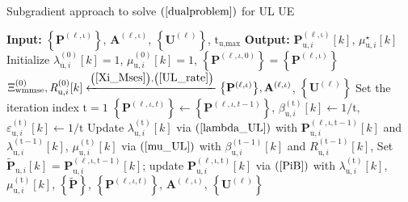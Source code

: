\documentclass[10pt,journal]{IEEEtran}
\newcommand{\paren}[1]{\left({#1}\right)}
\newcommand{\bracket}[1]{{\left [{#1}\right ]}}
\newcommand{\braces}[1]{{\left\{ {#1}\right\}}}
\newcommand{\sfrac}[2]{#1/#2}
\theoremstyle{definition}
\begin{document}
\begin{algorithm}[ht!]
\caption{Subgradient approach to solve $\paren{\ref{dualproblem}}$ for UL UE}
\label{ULalgorithm}
\begin{algorithmic}[1]
\Statex \textbf{Input: } $\braces{\mathbf{P}^{\paren{\mathrm{\ell,\iota}}}}$,  $\mathbf{A}^{\paren{\mathrm{\ell,\iota}}}$, $\braces{\mathbf{U}^{\paren{\mathrm{\ell}}}}$, $\mathrm{t}_{\textrm{u,max}}$
\Statex \textbf{Output:} $\mathbf{P}^{\paren{\mathrm{\ell,\iota}}}_{\textrm{u},i}\bracket{k}$, $\mu^\star_{\textrm{u},i}\bracket{k}$
\State Initialize $\lambda^{\paren{\mathrm{0}}}_{\textrm{u},i}\bracket{k}=1$, $\mu^{\paren{\mathrm{0}}}_{\textrm{u},i}\bracket{k}=1$, $\braces{\mathbf{P}^{\paren{\ell,\iota,0}}}=\braces{\mathbf{P}^{\paren{\mathrm{\ell,\iota}}}}$ 
\State $\Xi^{\paren{\mathrm{0}}}_{\textrm{wmmse}},\mathit{R}^{\paren{\mathrm{0}}}_{\textrm{u},i}\bracket{k}\xleftarrow{\paren{\mathrm{\ref{Xi_Mses}}},\paren{\mathrm{\ref{UL_rate}}}}\braces{\mathbf{P}^{\paren{\mathrm{\ell,\iota}}}},\mathbf{A}^{\paren{\mathrm{\ell,\iota}}}$, $\braces{\mathbf{U}^{\paren{\mathrm{\ell}}}}$
\State Set the iteration index $\mathrm{t}=1$
\Repeat
\State $\braces{\mathbf{P}^{\paren{\ell,\iota,t}}}\leftarrow\braces{\mathbf{P}^{\paren{\ell,\iota,t-1}}}$, $\beta^{\paren{\mathrm{t}}}_{\textrm{u},i}\bracket{k}\leftarrow\sfrac{1}{\mathrm{t}}$, $\varepsilon^{\paren{\mathrm{t}}}_{\textrm{u},i}\bracket{k}\leftarrow\sfrac{1}{\mathrm{t}}$
\State Update $\lambda^{\paren{\mathrm{t}}}_{\textrm{u},i}\bracket{k}$ via $\mathrm{\paren{\ref{lambda_UL}}}$ with $\mathbf{P}^{\paren{\mathrm{\ell,\iota,t-1}}}_{\textrm{u},i}\bracket{k}$ and $\lambda^{\paren{\mathrm{t-1}}}_{\textrm{u},i}\bracket{k}$, $\mu^{\paren{\mathrm{t}}}_{\textrm{u},i}\bracket{k}$ via $\mathrm{\paren{\ref{mu_UL}}}$ with $\beta^{\paren{\mathrm{t-1}}}_{\textrm{u},i}\bracket{k}$ and $\mathit{R}^{\paren{\mathrm{t-1}}}_{\textrm{u},i}\bracket{k}$, 
\State Set $\widetilde{\mathbf{P}}_{\textrm{u},i}\bracket{k}$ = $\mathbf{P}^{\paren{\mathrm{\ell,\iota,t-1}}}_{\textrm{u},i}\bracket{k}$; update $\mathbf{P}^{\paren{\mathrm{\ell,\iota,t}}}_{\textrm{u},i}\bracket{k}$ via $\mathrm{\paren{\ref{PiB}}}$ with $\lambda^{\paren{\mathrm{t}}}_{\textrm{u},i}\bracket{k}$, $\mu^{\paren{\mathrm{t}}}_{\textrm{u},i}\bracket{k}$, $\braces{\widetilde{\mathbf{P}}}$, $\braces{\mathbf{P}^{\paren{\ell,\iota,t}}}$, $\mathbf{A}^{\paren{\mathrm{\ell,\iota}}}$, $\braces{\mathbf{U}^{\paren{\mathrm{\ell}}}}$

\end{algorithmic}
\end{algorithm}
\end{document}
